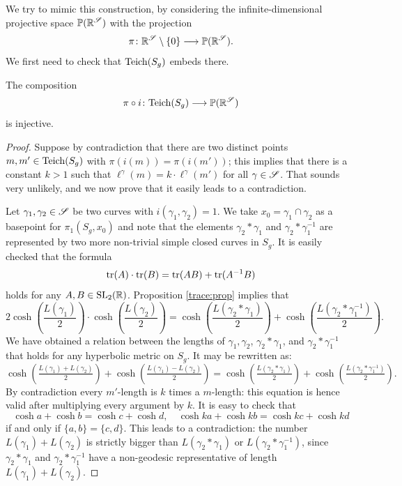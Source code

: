 We try to mimic this construction, by considering the infinite-dimensional projective space $\mathbb{P}(\mathbb{R}^\mathscr{S})$ with the projection 
$$\pi\colon \mathbb{R}^\mathscr{S}\setminus \{0\} \longrightarrow \mathbb{P}(\mathbb{R}^\mathscr{S}).$$
We first need to check that ${\rm Teich}(S_g)$ embeds there.
\begin{prop}
The composition
$$\pi\circ i \colon {\rm Teich}(S_g) \longrightarrow \mathbb{P}(\mathbb{R}^\mathscr{S})$$
is injective.
\end{prop}
\begin{proof}
Suppose by contradiction that there are two distinct points $m, m' \in {\rm Teich}(S_g)$ with $\pi(i(m)) = \pi(i(m'))$; this implies that there is a constant $k>1$ such that $\ell^\gamma(m) = k\cdot\ell^\gamma(m')$ for all $\gamma\in\mathscr{S}$. That sounds very unlikely, and we now prove that it easily leads to a contradiction.

Let $\gamma_1, \gamma_2 \in \mathscr{S}$ be two curves with $i(\gamma_1,\gamma_2)=1$. We take $x_0 = \gamma_1 \cap \gamma_2$ as a basepoint for $\pi_1(S_g, x_0)$ and note that the elements $\gamma_2*\gamma_1$ and $\gamma_2*\gamma_1^{-1}$ are represented by two more non-trivial simple closed curves in $S_g$. It is easily checked that the formula
$${\rm tr}(A)\cdot {\rm tr}(B) = {\rm tr}(AB) + {\rm tr}(A^{-1}B)$$
holds for any $A,B \in {\rm SL}_2(\mathbb{R})$. Proposition \ref{trace:prop} implies that
$$2\cosh \left(\frac{L(\gamma_1)}2 \right) \cdot \cosh\left(\frac{L(\gamma_2)}2 \right) = 
\cosh\left(\frac{L(\gamma_2*\gamma_1)}2 \right) + \cosh\left(\frac{L(\gamma_2*\gamma_1^{-1})}2 \right).$$
We have obtained a relation between the lengths of $\gamma_1, \gamma_2$, $\gamma_2* \gamma_1$, and $\gamma_2*\gamma_1^{-1}$ that holds for any hyperbolic metric on $S_g$. It may be rewritten as: 
$$ \cosh\left(\tfrac{L(\gamma_1) + L(\gamma_2)}2 \right) + \cosh\left(\tfrac{L(\gamma_1) - L(\gamma_2)}2 \right) = \cosh\left(\tfrac{L(\gamma_2*\gamma_1)}2 \right) + \cosh\left(\tfrac{L(\gamma_2*\gamma_1^{-1})}2 \right).
$$
By contradiction every $m'$-length is $k$ times a $m$-length: this equation is hence valid after multiplying every argument by $k$. It is easy to check that 
$$\cosh a + \cosh b = \cosh c + \cosh d, \quad \cosh ka + \cosh kb = \cosh kc + \cosh kd$$ 
if and only if $\{a,b\} = \{c,d\}$. This leads to a contradiction: the number $L(\gamma_1)+L(\gamma_2)$ is strictly bigger than $L(\gamma_2*\gamma_1)$ or $L(\gamma_2*\gamma_1^{-1})$, since $\gamma_2*\gamma_1$ and $\gamma_2*\gamma_1^{-1}$ have a non-geodesic representative of length $L(\gamma_1)+L(\gamma_2)$.
\end{proof}

